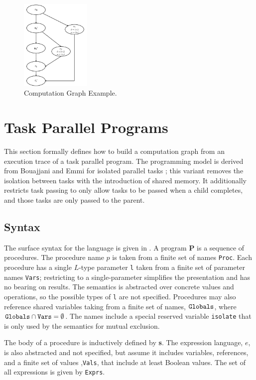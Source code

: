\begin{figure}
  \centering
        \includegraphics[width=0.3\textwidth]{../figs/Fig3-1.pdf}
    \caption{Computation Graph Example.}
    \label{fig:cg}
    \vspace{-1em}
\end{figure}

\section{Task Parallel Programs} \label{sec:cg}
This section formally defines how to build a computation graph from an
execution trace of a task parallel program.  The programming model is
derived from Bouajjani and Emmi for isolated parallel tasks
\cite{bouajjani}; this variant removes the isolation between tasks
with the introduction of shared memory. It additionally restricts task
passing to only allow tasks to be passed when a child completes, and
those tasks are only passed to the parent.

\subsection{Syntax}
The surface syntax for the language is given in .
A program \textbf{P} is a sequence of procedures.  The procedure name
$p$ is taken from a finite set of names \texttt{Proc}.  Each procedure
has a single $L$-type parameter \texttt{l} taken from a finite set of
parameter names \texttt{Vars}; restricting to a single-parameter simplifies the presentation and has no bearing on results.  The
semantics is abstracted over concrete values and operations, so the
possible types of \texttt{l} are not specified. Procedures may also
reference shared variables taking from a finite set of names, $\mathtt{Globals}$,
where $\mathtt{Globals} \cap \mathtt{Vars} = \emptyset$. The names include a
special reserved variable \texttt{isolate} that is only used by the
semantics for mutual exclusion.

The body of a procedure is inductively defined by \textbf{s}.  The
expression language, $e$, is also abstracted and not specified, but
assume it includes variables, references, and a finite set of values
,\texttt{Vals}, that include at least Boolean values.  The set of all
expressions is given by \texttt{Exprs}.

